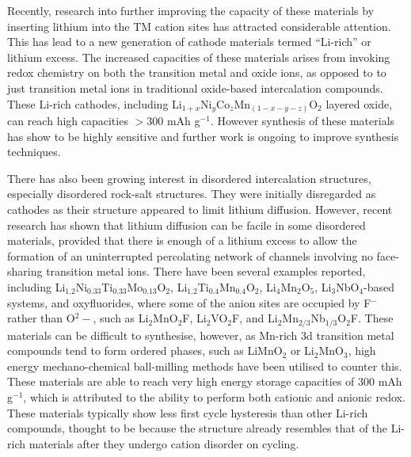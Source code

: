 \documentclass[../main.tex]{subfiles}
\begin{document}
Recently, research into further improving the capacity of these materials by inserting lithium into the TM cation sites has attracted considerable attention. This has lead to a new generation of cathode materials termed ``Li-rich'' or lithium excess. The increased capacities of these materials arises from invoking redox chemistry on both the transition metal and oxide ions, as opposed to to just transition metal ions in traditional oxide-based intercalation compounds. \cite{Sathiya2013,lee2014unlocking,Oishi2015,Seo2016,Gent2017,Assat2018,naylor2019depth,House2020,House2020a} These Li-rich cathodes, including Li$_{1+x}$Ni$_y$Co$_z$Mn$_{(1-x-y-z)}$O$_2$ layered oxide, can reach high capacities $>300$ mAh g$^{-1}$. However synthesis of these materials has show to be highly sensitive and further work is ongoing to improve synthesis techniques.\cite{Hy2016} 

There has also been growing interest in disordered intercalation structures, especially disordered rock-salt structures. They were initially disregarded as cathodes as their structure appeared to limit lithium diffusion. However, recent research has shown that lithium diffusion can be facile in some disordered materials, provided that there is enough of a lithium excess to allow the formation of an uninterrupted percolating network of channels involving no face-sharing transition metal ions.\cite{lee2014unlocking,Urban2014,Lee2015} There have been several examples reported, including Li$_{1.2}$Ni$_{0.33}$Ti$_{0.33}$Mo$_{0.13}$O$_2$,\cite{Lee2015} Li$_{1.2}$Ti$_{0.4}$Mn$_{0.4}$O$_2$,\cite{Yabuuchi2016a} Li$_4$Mn$_2$O$_5$,\cite{Freire2016,Yao2018,Bhandari2019454} Li$_3$NbO$_4$-based systems,\cite{Nakajima2017,Yabuuchi2015,Wang2015} and oxyfluorides, where some of the anion sites are occupied by F$^-$ rather than O$^2-$, such as Li$_2$MnO$_2$F,\cite{Sharpe2020,House2018,Lun2020} Li$_2$VO$_2$F,\cite{Chen2015,Chen2015a,Baur2019, Cambaz2019, Baur2020, Kallquist2019, Chang2020} and Li$_2$Mn$_{2/3}$Nb$_{1/3}$O$_2$F.\cite{Lee2018} These materials can be difficult to synthesise, however, as Mn-rich 3d transition metal compounds tend to form ordered phases, such as LiMnO$_2$ or Li$_2$MnO$_3$, high energy mechano-chemical ball-milling methods have been utilised to counter this.\cite{Freire2016,House2018,Freire2017} These materials are able to reach very high energy storage capacities of $300$ mAh g$^{-1}$, \cite{Jacquet2019} which is attributed to the ability to perform both cationic and anionic redox. \cite{Jacquet2019,clement2020,Chang2020} These materials typically show less first cycle hysteresis than other Li-rich compounds, thought to be because the structure already resembles that of the Li-rich materials after they undergo cation disorder on cycling.
\end{document}

